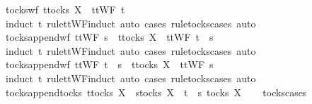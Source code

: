 \isanewline
{}\isamarkupfalse%
\ tocks{\isacharunderscore}wf{\isacharcolon}\ {\isachardoublequoteopen}t{\isasymin}tocks\ X\ {\isasymLongrightarrow}\ ttWF\ t{\isachardoublequoteclose}\isanewline
%
\isadelimproof
\ \ %
\endisadelimproof
%
\isatagproof
{}\isamarkupfalse%
\ {\isacharparenleft}induct\ t\ rule{\isacharcolon}ttWF{\isachardot}induct{\isacharcomma}\ auto{\isacharcomma}\ {\isacharparenleft}cases\ rule{\isacharcolon}tocks{\isachardot}cases{\isacharcomma}\ auto{\isacharparenright}{\isacharplus}{\isacharparenright}%
\endisatagproof
{\isafoldproof}%
%
\isadelimproof
\isanewline
%
\endisadelimproof
\isanewline
{}\isamarkupfalse%
\ tocks{\isacharunderscore}append{\isacharunderscore}wf{\isacharcolon}\ {\isachardoublequoteopen}ttWF\ s\ {\isasymLongrightarrow}\ t{\isasymin}tocks\ X\ {\isasymLongrightarrow}\ ttWF\ {\isacharparenleft}t\ {\isacharat}\ s{\isacharparenright}{\isachardoublequoteclose}\isanewline
%
\isadelimproof
\ \ %
\endisadelimproof
%
\isatagproof
{}\isamarkupfalse%
\ {\isacharparenleft}induct\ t\ rule{\isacharcolon}ttWF{\isachardot}induct{\isacharcomma}\ auto{\isacharcomma}\ {\isacharparenleft}cases\ rule{\isacharcolon}tocks{\isachardot}cases{\isacharcomma}\ auto{\isacharparenright}{\isacharplus}{\isacharparenright}%
\endisatagproof
{\isafoldproof}%
%
\isadelimproof
\isanewline
%
\endisadelimproof
\isanewline
{}\isamarkupfalse%
\ tocks{\isacharunderscore}append{\isacharunderscore}wf{}{\isacharcolon}\ {\isachardoublequoteopen}ttWF\ {\isacharparenleft}t\ {\isacharat}\ s{\isacharparenright}\ {\isasymLongrightarrow}\ t{\isasymin}tocks\ X\ {\isasymLongrightarrow}\ ttWF\ s{\isachardoublequoteclose}\isanewline
%
\isadelimproof
\ \ %
\endisadelimproof
%
\isatagproof
{}\isamarkupfalse%
\ {\isacharparenleft}induct\ t\ rule{\isacharcolon}ttWF{\isachardot}induct{\isacharcomma}\ auto{\isacharcomma}\ {\isacharparenleft}cases\ rule{\isacharcolon}tocks{\isachardot}cases{\isacharcomma}\ auto{\isacharparenright}{\isacharplus}{\isacharparenright}%
\endisatagproof
{\isafoldproof}%
%
\isadelimproof
\isanewline
%
\endisadelimproof
\isanewline
{}\isamarkupfalse%
\ tocks{\isacharunderscore}append{\isacharunderscore}tocks{\isacharcolon}\ {\isachardoublequoteopen}t{\isasymin}tocks\ X\ {\isasymLongrightarrow}\ s{\isasymin}tocks\ X\ {\isasymLongrightarrow}\ t\ {\isacharat}\ s\ {\isasymin}tocks\ X{\isachardoublequoteclose}\isanewline
%
\isadelimproof
\ \ %
\endisadelimproof
%
\isatagproof
{}\isamarkupfalse%
\ tocks{\isachardot}cases\ \isamarkupfalse%

